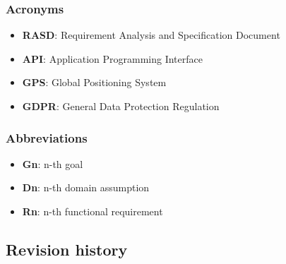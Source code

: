 \subsubsection{Acronyms}
\begin{itemize}
\item \textbf{RASD}: Requirement Analysis and Specification Document
\item \textbf{API}: Application Programming Interface
\item \textbf{GPS}: Global Positioning System
\item \textbf{GDPR}: General Data Protection Regulation
\end{itemize}

\subsubsection{Abbreviations}
\begin{itemize}
\item \textbf{Gn}: n-th goal
\item \textbf{Dn}: n-th domain assumption
\item \textbf{Rn}: n-th functional requirement
\end{itemize}

\FloatBarrier
\subsection{Revision	history}

